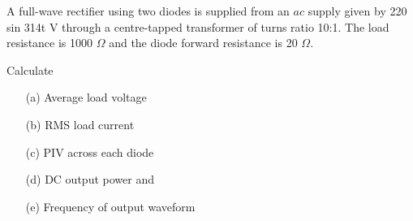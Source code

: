 \smallskip
\begin{example}\label{exam2.10}
A full-wave rectifier using two diodes is supplied from an $ac$ supply
given by 220 sin 314t V through a centre-tapped transformer of turns
ratio 10:1. The load resistance is 1000 $\Omega$ and the diode forward
resistance is 20 $\Omega$.

\noindent
Calculate
\begin{itemize}
\itemsep=1pt
\item[(a)] Average load voltage

\item[(b)] RMS load current

\item[(c)] PIV across each diode 

\item[(d)] DC output power and

\item[(e)] Frequency of output waveform
\end{itemize}
\end{example}

